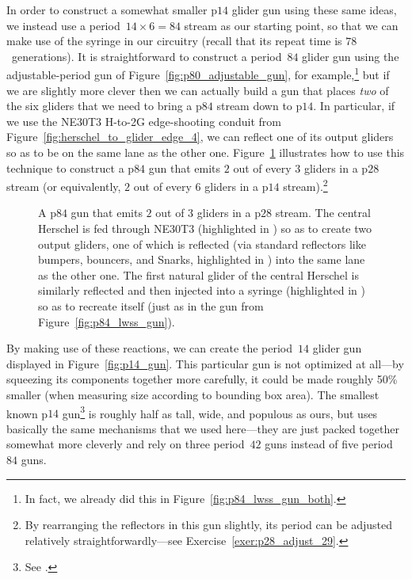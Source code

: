 In order to construct a somewhat smaller p$14$ glider gun using these same ideas, we instead use a period~$14 \times 6 = 84$ stream as our starting point, so that we can make use of the syringe in our circuitry (recall that its repeat time is $78$~generations). It is straightforward to construct a period~$84$ glider gun using the adjustable-period gun of Figure~\ref{fig:p80_adjustable_gun}, for example,\footnote{In fact, we already did this in Figure~\ref{fig:p84_lwss_gun_both}.} but if we are slightly more clever then we can actually build a gun that places \emph{two} of the six gliders that we need to bring a p$84$ stream down to p$14$. In particular, if we use the NE30T3 H-to-2G edge-shooting conduit from Figure~\ref{fig:herschel_to_glider_edge_4}, we can reflect one of its output gliders so as to be on the same lane as the other one. Figure~\ref{fig:p14_pieces_p84} illustrates how to use this technique to construct a p$84$ gun that emits $2$ out of every $3$ gliders in a p$28$ stream (or equivalently, $2$ out of every $6$ gliders in a p$14$ stream).\footnote{By rearranging the reflectors in this gun slightly, its period can be adjusted relatively straightforwardly---see Exercise~\ref{exer:p28_adjust_29}.}

\begin{figure}[!htb]
	\centering
	\caption{A p$84$ gun that emits $2$ out of $3$ gliders in a p$28$ stream. The central Herschel is fed through NE30T3 (highlighted in ) so as to create two output gliders, one of which is reflected (via standard reflectors like bumpers, bouncers, and Snarks, highlighted in ) into the same lane as the other one. The first natural glider of the central Herschel is similarly reflected and then injected into a syringe (highlighted in ) so as to recreate itself (just as in the gun from Figure~\ref{fig:p84_lwss_gun}).}
	\label{fig:p14_pieces_p84}
\end{figure}

By making use of these reactions, we can create the period~$14$ glider gun displayed in Figure~\ref{fig:p14_gun}. This particular gun is not optimized at all---by squeezing its components together more carefully, it could be made roughly 50\% smaller (when measuring size according to bounding box area). The smallest known p$14$ gun\footnote{See .} is roughly half as tall, wide, and populous as ours, but uses basically the same mechanisms that we used here---they are just packed together somewhat more cleverly and rely on three period~$42$ guns instead of five period~$84$ guns.

